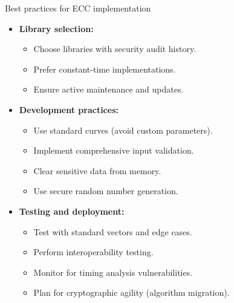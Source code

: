 \documentclass[aspectratio=169, lualatex, handout]{beamer}
\begin{document}
\begin{frame}{Best practices for ECC implementation}
	\begin{itemize}[<+->]
		\item \textbf{Library selection:}
		      \begin{itemize}
			      \item Choose libraries with security audit history.
			      \item Prefer constant-time implementations.
			      \item Ensure active maintenance and updates.
		      \end{itemize}
		\item \textbf{Development practices:}
		      \begin{itemize}
			      \item Use standard curves (avoid custom parameters).
			      \item Implement comprehensive input validation.
			      \item Clear sensitive data from memory.
			      \item Use secure random number generation.
		      \end{itemize}
		\item \textbf{Testing and deployment:}
		      \begin{itemize}
			      \item Test with standard vectors and edge cases.
			      \item Perform interoperability testing.
			      \item Monitor for timing analysis vulnerabilities.
			      \item Plan for cryptographic agility (algorithm migration).
		      \end{itemize}
	\end{itemize}
\end{frame}
\end{document}
